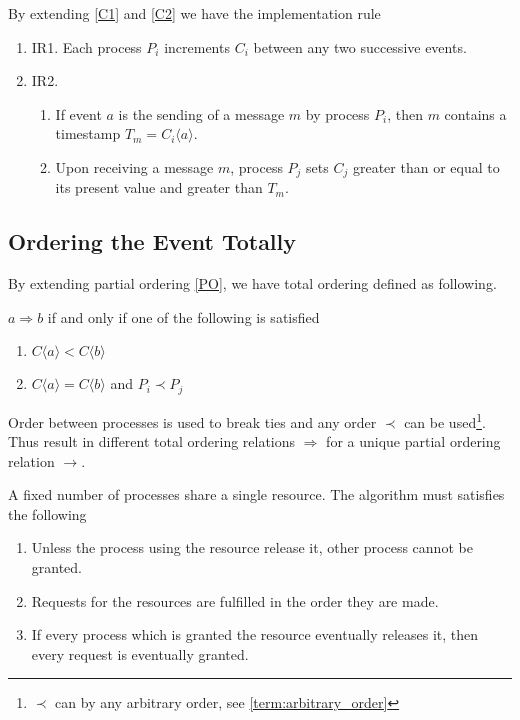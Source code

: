 \documentclass[12pt,a4paper,oneside]{article}
\begin{document}
By extending \ref{C1} and \ref{C2} we have the implementation rule

\begin{enumerate}
  \item \label{IR1} IR1. Each process $P_i$ increments $C_i$ between any two successive events\cite{l}.
  \item \label{IR2} IR2.
  \begin{enumerate}
    \item If event $a$ is the sending of a message $m$ by process $P_i$, then $m$ contains a timestamp $T_m=C_i\langle a \rangle$\cite{l}.
    \item Upon receiving a message $m$, process $P_j$ sets $C_j$ greater than or equal to its present value and greater than $T_m$\cite{l}.
  \end{enumerate}
\end{enumerate}

\subsection{Ordering the Event Totally} \label{TO}

By extending partial ordering \ref{PO}, we have total ordering defined as following.

\medskip

$a \Rightarrow b$ if and only if one of the following is satisfied

\begin{enumerate}
  \item $C\langle a \rangle < C\langle b \rangle$
  \item $C\langle a \rangle = C\langle b \rangle$ and $P_i \prec P_j$
\end{enumerate}

Order between processes is used to break ties and any order $\prec$ can be used\footnote{$\prec$ can by any arbitrary order, see \ref{term:arbitrary_order}}.
Thus result in different total ordering relations $\Rightarrow$ for a unique partial ordering relation $\rightarrow$.


A fixed number of processes share a single resource. The algorithm must satisfies the following

\begin{enumerate}
  \item Unless the process using the resource release it, other process cannot be granted.
  \item Requests for the resources are fulfilled in the order they are made.
  \item If every process which is granted the resource eventually releases it, then every request is eventually granted\cite{l}.
\end{enumerate}
\end{document}
